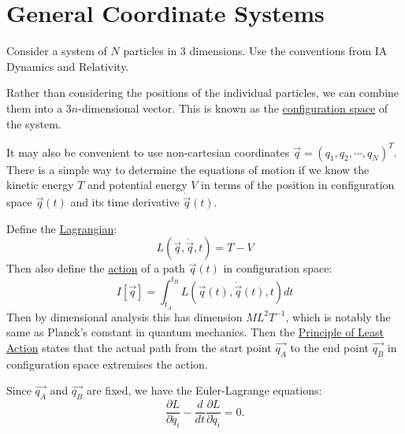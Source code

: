 \documentclass[../Main.tex]{subfiles}
\begin{document}
\section{General Coordinate Systems}
Consider a system of $N$ particles in $3$ dimensions. Use the conventions from IA Dynamics and Relativity.

Rather than considering the positions of the individual particles, we can combine them into a $3n$-dimensional vector. This is known as the \underline{configuration space} of the system.

It may also be convenient to use non-cartesian coordinates $\vec{q} = (q_1, q_2, \cdots, q_N)^T$. There is a simple way to determine the equations of motion if we know the kinetic energy $T$ and potential energy $V$ in terms of the position in configuration space $\vec{q}(t)$ and its time derivative $\dot{\vec{q}}(t)$.

Define the \underline{Lagrangian}:
\begin{equation}
    L(\vec{q}, \dot{\vec{q}}, t) = T - V
    \label{eqnLagrangian}
\end{equation}
Then also define the \underline{action} of a path $\vec{q}(t)$ in configuration space:
\begin{equation}
    I[\vec{q}] = \int_{t_A}^{t_B} L(\vec{q}(t), \dot{\vec{q}}(t), t)dt
\end{equation}
Then by dimensional analysis this has dimension $ML^2T^{-1}$, which is notably the same as Planck's constant in quantum mechanics.
Then the \underline{Principle of Least Action} states that the actual path from the start point $\vec{q_A}$ to the end point $\vec{q_B}$ in configuration space extremises the action.

Since $\vec{q_A}$ and $\vec{q_B}$ are fixed, we have the Euler-Lagrange equations:
\begin{equation*}
    \frac{\partial L}{\partial q_i} - \frac{d}{dt} \frac{\partial L}{\partial \dot{q}_i} = 0.
\end{equation*}
\end{document}

